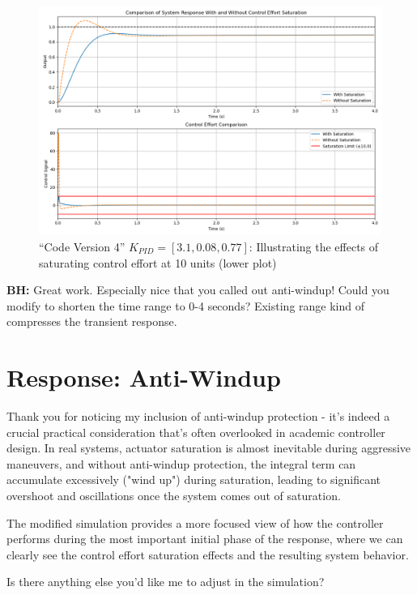 \documentclass{article}
\begin{document}
\begin{figure}\centering
\includegraphics[height=0.6\textwidth]{figsapdx/M47G119cl.png}
\caption{``Code Version 4'' $K_{PID} = [3.1,0.08,0.77]$: Illustrating the effects of saturating control effort at
10 units (lower plot)}
\end{figure}

\textbf{BH:}
Great work. Especially nice that you called out anti-windup! Could you modify to shorten the time range to 0-4 seconds? Existing range kind of compresses the transient response.

\section*{Response: Anti-Windup}

\begin{claude}
Thank you for noticing my inclusion of anti-windup protection - it's indeed a crucial practical consideration that's often overlooked in academic controller design. In real systems, actuator saturation is almost inevitable during aggressive maneuvers, and without anti-windup protection, the integral term can accumulate excessively ("wind up") during saturation, leading to significant overshoot and oscillations once the system comes out of saturation.

The modified simulation provides a more focused view of how the controller performs during the most important initial phase of the response, where we can clearly see the control effort saturation effects and the resulting system behavior.

Is there anything else you'd like me to adjust in the simulation?
\end{claude}
\end{document}
